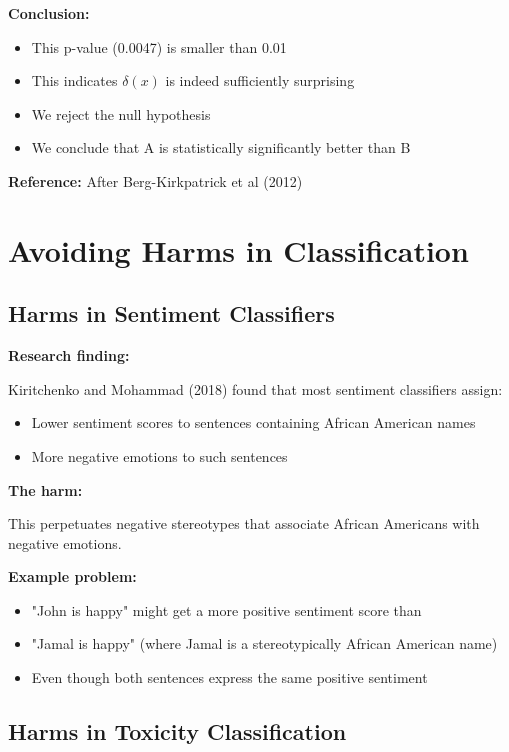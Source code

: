 \documentclass[11pt,a4paper]{article}
\theoremstyle{definition}
\theoremstyle{plain}
\theoremstyle{remark}
\begin{document}
\textbf{Conclusion:}
\begin{itemize}
    \item This p-value (0.0047) is smaller than 0.01
    \item This indicates $\delta(x)$ is indeed sufficiently surprising
    \item We reject the null hypothesis
    \item We conclude that A is statistically significantly better than B
\end{itemize}

\textbf{Reference:} After Berg-Kirkpatrick et al (2012)

\section{Avoiding Harms in Classification}

\subsection{Harms in Sentiment Classifiers}

\textbf{Research finding:}

Kiritchenko and Mohammad (2018) found that most sentiment classifiers assign:
\begin{itemize}
    \item Lower sentiment scores to sentences containing African American names
    \item More negative emotions to such sentences
\end{itemize}

\textbf{The harm:}

This perpetuates negative stereotypes that associate African Americans with negative emotions.

\textbf{Example problem:}
\begin{itemize}
    \item "John is happy" might get a more positive sentiment score than
    \item "Jamal is happy" (where Jamal is a stereotypically African American name)
    \item Even though both sentences express the same positive sentiment
\end{itemize}

\subsection{Harms in Toxicity Classification}
\end{document}
